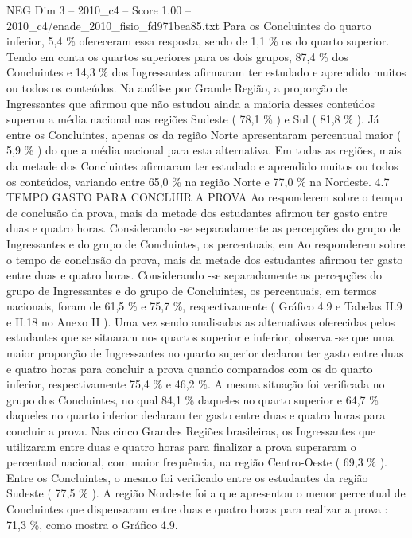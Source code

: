 \begin{textsample}{NEG Dim 3 – 2010\_c4 – Score 1.00 – 2010\_c4/enade\_2010\_fisio\_fd971bea85.txt}
Para os Concluintes do quarto inferior, 5,4 \% ofereceram essa resposta, sendo de 1,1 \% os do quarto superior.
Tendo em conta os quartos superiores para os dois grupos, 87,4 \% dos Concluintes e 14,3 \% dos Ingressantes afirmaram ter estudado e aprendido muitos ou todos os conteúdos.
Na análise por Grande Região, a proporção de Ingressantes que afirmou que não estudou ainda a maioria desses conteúdos superou a média nacional nas regiões Sudeste ( 78,1 \% ) e Sul ( 81,8 \% ).
Já entre os Concluintes, apenas os da região Norte apresentaram percentual maior ( 5,9 \% ) do que a média nacional para esta alternativa.
Em todas as regiões, mais da metade dos Concluintes afirmaram ter estudado e aprendido muitos ou todos os conteúdos, variando entre 65,0 \% na região Norte e 77,0 \% na Nordeste. 4.7 TEMPO GASTO PARA CONCLUIR A PROVA Ao responderem sobre o tempo de conclusão da prova, mais da metade dos estudantes afirmou ter gasto entre duas e quatro horas.
Considerando -se separadamente as percepções do grupo de Ingressantes e do grupo de Concluintes, os percentuais, em Ao responderem sobre o tempo de conclusão da prova, mais da metade dos estudantes afirmou ter gasto entre duas e quatro horas.
Considerando -se separadamente as percepções do grupo de Ingressantes e do grupo de Concluintes, os percentuais, em termos nacionais, foram de 61,5 \% e 75,7 \%, respectivamente ( Gráfico 4.9 e Tabelas II.9 e II.18 no Anexo II ).
Uma vez sendo analisadas as alternativas oferecidas pelos estudantes que se situaram nos quartos superior e inferior, observa -se que uma maior proporção de Ingressantes no quarto superior declarou ter gasto entre duas e quatro horas para concluir a prova quando comparados com os do quarto inferior, respectivamente 75,4 \% e 46,2 \%.
A mesma situação foi verificada no grupo dos Concluintes, no qual 84,1 \% daqueles no quarto superior e 64,7 \% daqueles no quarto inferior declaram ter gasto entre duas e quatro horas para concluir a prova.
Nas cinco Grandes Regiões brasileiras, os Ingressantes que utilizaram entre duas e quatro horas para finalizar a prova superaram o percentual nacional, com maior frequência, na região Centro-Oeste ( 69,3 \% ).
Entre os Concluintes, o mesmo foi verificado entre os estudantes da região Sudeste ( 77,5 \% ).
A região Nordeste foi a que apresentou o menor percentual de Concluintes que dispensaram entre duas e quatro horas para realizar a prova : 71,3 \%, como mostra o Gráfico 4.9.

\end{textsample}
